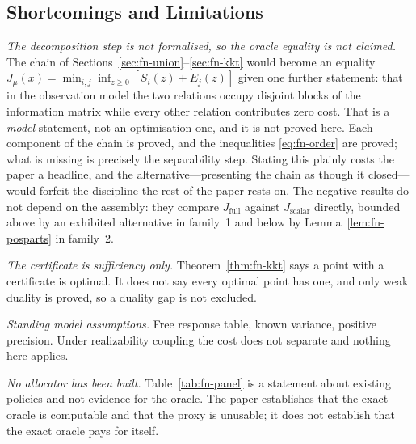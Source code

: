 \subsection{Shortcomings and Limitations}

\emph{The decomposition step is not formalised, so the oracle equality is not claimed.} The
chain of Sections~\ref{sec:fn-union}--\ref{sec:fn-kkt} would become an equality
$J_{\mu}(x)=\min_{i,j}\inf_{z\ge0}[S_{i}(z)+E_{j}(z)]$ given one further statement: that in
the observation model the two relations occupy disjoint blocks of the information matrix
while every other relation contributes zero cost. That is a \emph{model} statement, not an
optimisation one, and it is not proved here. Each component of the chain is proved, and the
inequalities \eqref{eq:fn-order} are proved; what is missing is precisely the separability step.
Stating this plainly costs the paper a headline, and the alternative---presenting the chain as
though it closed---would forfeit the discipline the rest of the paper rests on. The negative
results do not depend on the assembly: they compare $J_{\mathrm{full}}$ against
$J_{\mathrm{scalar}}$ directly, bounded above by an exhibited alternative in family~1 and
below by Lemma~\ref{lem:fn-posparts} in family~2.

\emph{The certificate is sufficiency only.} Theorem~\ref{thm:fn-kkt} says a point with a
certificate is optimal. It does not say every optimal point has one, and only weak duality is
proved, so a duality gap is not excluded.

\emph{Standing model assumptions.} Free response table, known variance, positive precision.
Under realizability coupling the cost does not separate and nothing here applies.

\emph{No allocator has been built.} Table~\ref{tab:fn-panel} is a statement about existing
policies and not evidence for the oracle. The paper establishes that the exact oracle is
computable and that the proxy is unusable; it does not establish that the exact oracle pays
for itself.

